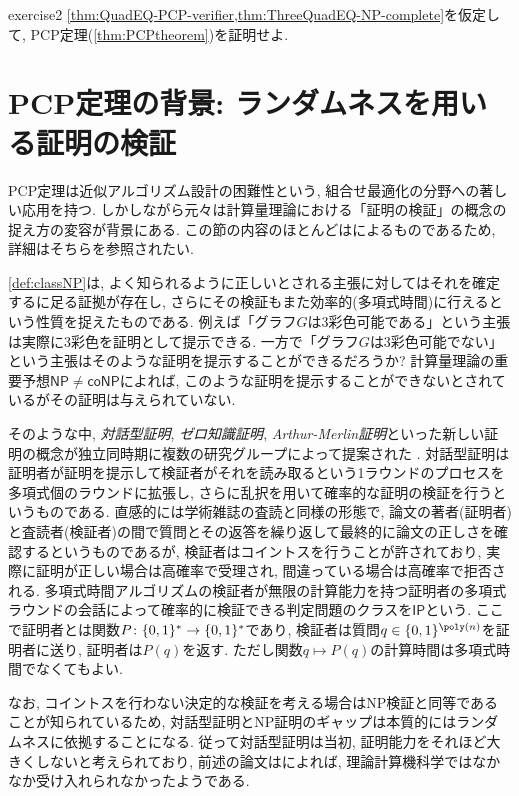 \begin{exercise}{}{exercise2}
  \cref{thm:QuadEQ-PCP-verifier,thm:ThreeQuadEQ-NP-complete}を仮定して, PCP定理(\cref{thm:PCPtheorem})を証明せよ.
\end{exercise}

\section{PCP定理の背景: ランダムネスを用いる証明の検証} \label{sec:background-of-PCP}
PCP定理は近似アルゴリズム設計の困難性という, 組合せ最適化の分野への著しい応用を持つ. しかしながら元々は計算量理論における「証明の検証」の概念の捉え方の変容が背景にある.
この節の内容のほとんどは\cite{history-of-PCP}によるものであるため,
詳細はそちらを参照されたい.

\cref{def:classNP}は, よく知られるように正しいとされる主張に対してはそれを確定するに足る証拠が存在し, さらにその検証もまた効率的(多項式時間)に行えるという性質を捉えたものである.
例えば「グラフ$G$は3彩色可能である」という主張は実際に3彩色を証明として提示できる.
一方で「グラフ$G$は3彩色可能でない」という主張はそのような証明を提示することができるだろうか?
計算量理論の重要予想$\mathsf{NP}\ne\mathsf{coNP}$によれば, このような証明を提示することができないとされているがその証明は与えられていない.

そのような中, \emph{対話型証明}, \emph{ゼロ知識証明}, \emph{Arthur-Merlin証明}といった新しい証明の概念が独立同時期に複数の研究グループによって提案された \citet{GMR85,Babai1985}.
対話型証明は証明者が証明を提示して検証者がそれを読み取るという1ラウンドのプロセスを多項式個のラウンドに拡張し, さらに乱択を用いて確率的な証明の検証を行うというものである.
直感的には学術雑誌の査読と同様の形態で, 論文の著者(証明者)と査読者(検証者)の間で質問とその返答を繰り返して最終的に論文の正しさを確認するというものであるが, 検証者はコイントスを行うことが許されており, 実際に証明が正しい場合は高確率で受理され, 間違っている場合は高確率で拒否される.
多項式時間アルゴリズムの検証者が無限の計算能力を持つ証明者の多項式ラウンドの会話によって確率的に検証できる判定問題のクラスを$\mathsf{IP}$という.
ここで証明者とは関数$P\colon \{0,1\}^*\to\{0,1\}^*$であり, 検証者は質問$q\in\binset^{\poly(n)}$を証明者に送り, 証明者は$P(q)$を返す.
ただし関数$q\mapsto P(q)$の計算時間は多項式時間でなくてもよい.

なお, コイントスを行わない決定的な検証を考える場合はNP検証と同等であることが知られているため, 対話型証明とNP証明のギャップは本質的にはランダムネスに依拠することになる. 従って対話型証明は当初, 証明能力をそれほど大きくしないと考えられており, 前述の論文は\cite{history-of-PCP}によれば, 理論計算機科学ではなかなか受け入れられなかったようである.

